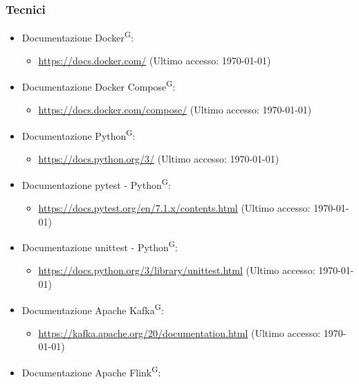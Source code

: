 \documentclass[8pt]{article}
\newcommand{\glossterm}[1]{#1\textsuperscript{G}} %
\begin{document}
\subsubsection{Tecnici}
\begin{itemize}
    \item Documentazione \glossterm{Docker}:
    \begin{itemize}
		\item \href{https://docs.docker.com/}{\color{myblue}https://docs.docker.com/} (Ultimo accesso: \today)
	\end{itemize}
    \item Documentazione \glossterm{Docker Compose}:
    \begin{itemize}
		\item \href{https://docs.docker.com/compose/}{\color{myblue}https://docs.docker.com/compose/} (Ultimo accesso: \today)
	\end{itemize}
    \item Documentazione \glossterm{Python}:
    \begin{itemize}
		\item \href{https://docs.python.org/3/}{\color{myblue}https://docs.python.org/3/} (Ultimo accesso: \today)
	\end{itemize}
    \item Documentazione pytest - \glossterm{Python}:
    \begin{itemize}
		\item \href{https://docs.pytest.org/en/7.1.x/contents.html}{\color{myblue}https://docs.pytest.org/en/7.1.x/contents.html} (Ultimo accesso: \today)
	\end{itemize}
    \item Documentazione unittest - \glossterm{Python}:
    \begin{itemize}
		\item \href{https://docs.python.org/3/library/unittest.html}{\color{myblue}https://docs.python.org/3/library/unittest.html} (Ultimo accesso: \today)
	\end{itemize}
    \item Documentazione Apache \glossterm{Kafka}:
    \begin{itemize}
		\item \href{https://kafka.apache.org/20/documentation.html}{\color{myblue}https://kafka.apache.org/20/documentation.html} (Ultimo accesso: \today)
	\end{itemize}
    \item Documentazione Apache \glossterm{Flink}:
    \begin{itemize}

\end{itemize}
\end{itemize}
\end{document}
